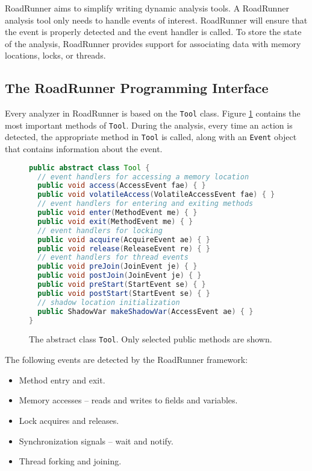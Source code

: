 RoadRunner aims to simplify writing dynamic analysis tools. A RoadRunner
analysis tool only needs to handle events of interest. RoadRunner will ensure
that the event is properly detected and the event handler is called. To store
the state of the analysis, RoadRunner provides support for associating data with
memory locations, locks, or threads.


\subsection{The RoadRunner Programming Interface}

Every analyzer in RoadRunner is based on the \texttt{Tool} class. Figure
\ref{toolclass} contains the most important methods of \texttt{Tool}. During the
analysis, every time an action is detected, the appropriate method in
\texttt{Tool} is called, along with an \texttt{Event} object that contains
information about the event.

\begin{figure}[hbt]
    \label{toolclass}
    \begin{lstlisting}[language=java]
public abstract class Tool {
  // event handlers for accessing a memory location
  public void access(AccessEvent fae) { }
  public void volatileAccess(VolatileAccessEvent fae) { }
  // event handlers for entering and exiting methods
  public void enter(MethodEvent me) { }
  public void exit(MethodEvent me) { }
  // event handlers for locking
  public void acquire(AcquireEvent ae) { }
  public void release(ReleaseEvent re) { }
  // event handlers for thread events
  public void preJoin(JoinEvent je) { }
  public void postJoin(JoinEvent je) { }
  public void preStart(StartEvent se) { }
  public void postStart(StartEvent se) { }
  // shadow location initialization
  public ShadowVar makeShadowVar(AccessEvent ae) { }
}
    \end{lstlisting}
    \caption{The abstract class \texttt{Tool}. Only selected public methods are
    shown.}
\end{figure}

The following events are detected by the RoadRunner framework:
\begin{itemize}
    \item Method entry and exit.
    \item Memory accesses -- reads and writes to fields and variables.
    \item Lock acquires and releases.
    \item Synchronization signals -- wait and notify.
    \item Thread forking and joining.
\end{itemize}

